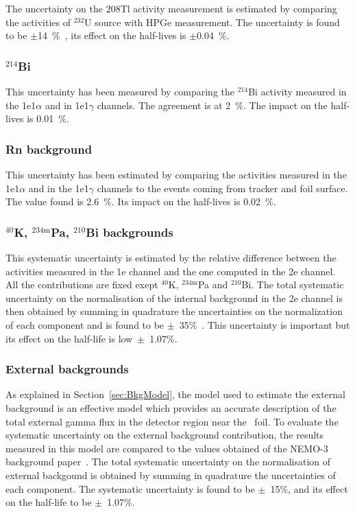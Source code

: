 \documentclass[main.tex]{subfiles}
\begin{document}
\NI The uncertainty on the $\text{208}$Tl activity measurement is estimated by comparing the activities of $^{\text{232}}$U source with HPGe measurement. The uncertainty is found to be $\pm$14~\%~\cite{PositionPaperSummer}, its effect on the half-lives is $\pm$0.04~\%. 
 
 
\subsubsection{$^{\text{214}}$Bi}


\NI This uncertainty has been measured by comparing the $^{\text{214}}$Bi activity measured in the 1e1$\alpha$ and in 1e1$\gamma$ channels. The agreement is at 2~\%. The impact on the half-lives is 0.01~\%.


\subsubsection{Rn background}


\NI This uncertainty has been estimated by comparing the activities measured in the 1e1$\alpha$ and in the 1e1$\gamma$ channels to the events coming from tracker and foil surface. The value found is 2.6~\%. Its impact on the half-lives is 0.02~\%.


\subsubsection{$^{\text{40}}$K, $^{\text{234m}}$Pa, $^{\text{210}}$Bi backgrounds}


\NI This systematic uncertainty is estimated by the relative difference between the activities measured in the 1e channel and the one computed in the 2e channel. All the contributions are fixed exept $^{\text{40}}$K, $^{\text{234m}}$Pa and $^{\text{210}}$Bi. The total systematic uncertainty on the normalisation of the internal background in the 2e channel is then obtained by summing in quadrature the uncertainties on the normalization of each component and is found to be $\pm$~35\%~\cite{Arnold2016bed}. This uncertainty is important but its effect on the half-life is low~$\pm$~1.07\%. 


\subsubsection{External backgrounds}



\NI As explained in Section~\ref{sec:BkgModel}, the model used to estimate the external background is an effective model which provides an accurate description of the total external gamma flux in the detector region near the \Cd~foil. To evaluate the systematic uncertainty on the external background contribution, the results measured in this model are compared to the values obtained of the NEMO-3 background paper~\cite{NEMO3-BKG}. The total systematic uncertainty on the normalisation of external backgound is obtained by summing in quadrature the uncertainties of each component. The systematic uncertainty is found to be $\pm$~15\%, and its effect on the half-life to be $\pm$~1.07\%. 
\end{document}
